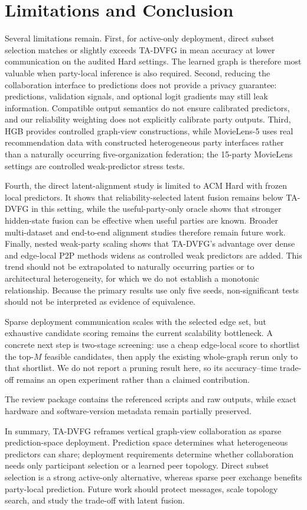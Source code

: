 \documentclass[letterpaper]{article} %
\newcommand{\method}{\textsc{TA-DVFG}}
\begin{document}
\section{Limitations and Conclusion}

Several limitations remain. First, for active-only deployment, direct subset
selection matches or slightly exceeds \method{} in mean accuracy at lower
communication on the audited Hard settings. The learned graph is therefore most
valuable when party-local inference is also required. Second, reducing the
collaboration interface to predictions does not provide a privacy guarantee:
predictions, validation signals, and optional logit gradients may still leak
information. Compatible output semantics do not ensure calibrated predictors, and our
reliability weighting does not explicitly calibrate party outputs. Third, HGB provides controlled
graph-view constructions, while
MovieLens-5 uses real recommendation data with constructed heterogeneous party
interfaces rather than a naturally occurring five-organization federation; the
15-party MovieLens settings are controlled weak-predictor stress tests.

Fourth, the direct latent-alignment study is limited to ACM Hard with frozen
local predictors. It shows that reliability-selected latent fusion remains below
\method{} in this setting, while the useful-party-only oracle shows that stronger
hidden-state fusion can be effective when useful parties are known. Broader
multi-dataset and end-to-end alignment studies therefore remain future work.
Finally, nested weak-party scaling shows that \method{}'s advantage over
dense and edge-local P2P methods widens as controlled weak predictors are
added. This trend should not be extrapolated to naturally occurring parties
or to architectural heterogeneity, for which we do not establish a monotonic
relationship. Because the primary results use only five seeds, non-significant tests should not be interpreted as evidence of equivalence.

Sparse deployment communication scales with the selected edge set, but
exhaustive candidate scoring remains the current scalability bottleneck. A
concrete next step is two-stage screening: use a cheap edge-local score to
shortlist the top-$M$ feasible candidates, then apply the existing whole-graph
rerun only to that shortlist. We do not report a pruning result here, so its
accuracy--time trade-off remains an open experiment rather than a claimed
contribution.

The review package contains the referenced scripts and raw outputs, while exact
hardware and software-version metadata remain partially preserved.

In summary, \method{} reframes vertical graph-view collaboration as sparse
prediction-space deployment. Prediction space determines what heterogeneous
predictors can share; deployment requirements determine whether collaboration
needs only participant selection or a learned peer topology. Direct subset selection is a strong active-only alternative, whereas sparse peer
exchange benefits party-local prediction. Future work should protect messages,
scale topology search, and study the trade-off with latent fusion.


\end{document}
